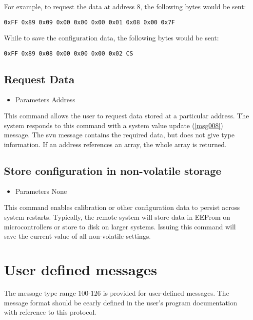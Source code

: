 For example, to request the data at address 8, the following bytes would be sent:
\begin{verbatim}
0xFF 0x89 0x09 0x00 0x00 0x00 0x01 0x08 0x00 0x7F
\end{verbatim}

While to save the configuration data, the following bytes would be sent:
\begin{verbatim}
0xFF 0x89 0x08 0x00 0x00 0x00 0x02 CS
\end{verbatim}

\subsection{Request Data}
\label{scm:rqd}

\begin{itemize}
\item Parameters
\subitem Address
\end{itemize}

This command allows the user to request data stored at a particular address. The system responds to this command with a system value update (\ref{msg008}) message. The svu message contains the required data, but does not give type information. If an address references an array, the whole array is returned.

\subsection{Store configuration in non-volatile storage}
\label{scm:scd}

\begin{itemize}
\item Parameters
\subitem None
\end{itemize}

This command enables calibration or other configuration data to persist across system restarts. Typically, the remote system will store data in EEProm on microcontrollers or store to disk on larger systems. Issuing this command will save the current value of all non-volatile settings.

\section{User defined messages}
\label{msg-user}
The message type range 100-126 is provided for user-defined messages. The message format should be cearly defined in the user's program documentation with reference to this protocol.

